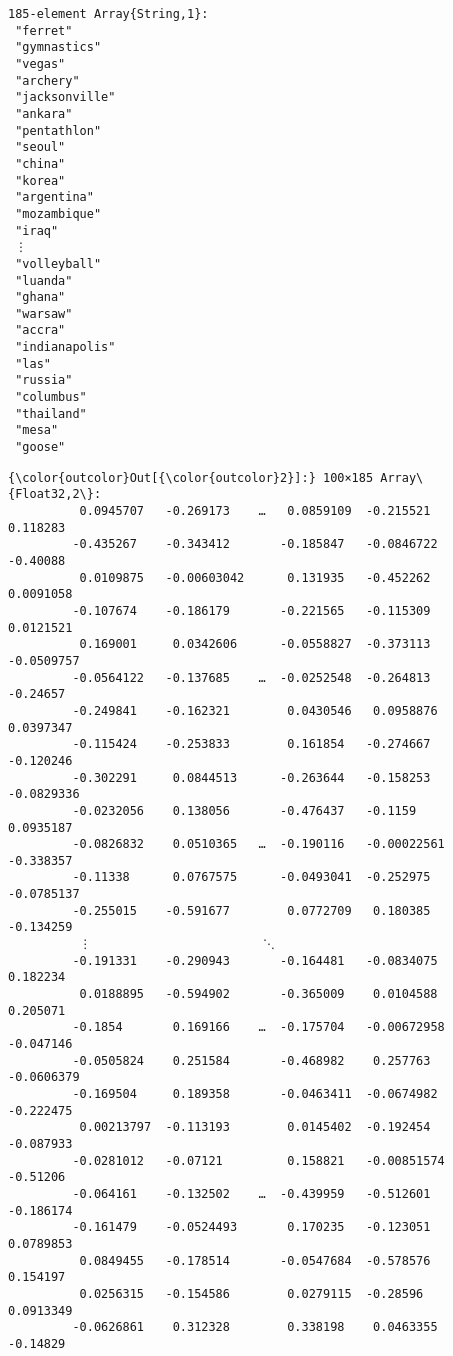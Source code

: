 \documentclass[11pt]{article}
\begin{document}
    
    \begin{verbatim}
185-element Array{String,1}:
 "ferret"      
 "gymnastics"  
 "vegas"       
 "archery"     
 "jacksonville"
 "ankara"      
 "pentathlon"  
 "seoul"       
 "china"       
 "korea"       
 "argentina"   
 "mozambique"  
 "iraq"        
 ⋮             
 "volleyball"  
 "luanda"      
 "ghana"       
 "warsaw"      
 "accra"       
 "indianapolis"
 "las"         
 "russia"      
 "columbus"    
 "thailand"    
 "mesa"        
 "goose"       
    \end{verbatim}

    
\begin{Verbatim}[commandchars=\\\{\}]
{\color{outcolor}Out[{\color{outcolor}2}]:} 100×185 Array\{Float32,2\}:
          0.0945707   -0.269173    …   0.0859109  -0.215521     0.118283 
         -0.435267    -0.343412       -0.185847   -0.0846722   -0.40088  
          0.0109875   -0.00603042      0.131935   -0.452262     0.0091058
         -0.107674    -0.186179       -0.221565   -0.115309     0.0121521
          0.169001     0.0342606      -0.0558827  -0.373113    -0.0509757
         -0.0564122   -0.137685    …  -0.0252548  -0.264813    -0.24657  
         -0.249841    -0.162321        0.0430546   0.0958876    0.0397347
         -0.115424    -0.253833        0.161854   -0.274667    -0.120246 
         -0.302291     0.0844513      -0.263644   -0.158253    -0.0829336
         -0.0232056    0.138056       -0.476437   -0.1159       0.0935187
         -0.0826832    0.0510365   …  -0.190116   -0.00022561  -0.338357 
         -0.11338      0.0767575      -0.0493041  -0.252975    -0.0785137
         -0.255015    -0.591677        0.0772709   0.180385    -0.134259 
          ⋮                        ⋱                                     
         -0.191331    -0.290943       -0.164481   -0.0834075    0.182234 
          0.0188895   -0.594902       -0.365009    0.0104588    0.205071 
         -0.1854       0.169166    …  -0.175704   -0.00672958  -0.047146 
         -0.0505824    0.251584       -0.468982    0.257763    -0.0606379
         -0.169504     0.189358       -0.0463411  -0.0674982   -0.222475 
          0.00213797  -0.113193        0.0145402  -0.192454    -0.087933 
         -0.0281012   -0.07121         0.158821   -0.00851574  -0.51206  
         -0.064161    -0.132502    …  -0.439959   -0.512601    -0.186174 
         -0.161479    -0.0524493       0.170235   -0.123051     0.0789853
          0.0849455   -0.178514       -0.0547684  -0.578576     0.154197 
          0.0256315   -0.154586        0.0279115  -0.28596      0.0913349
         -0.0626861    0.312328        0.338198    0.0463355   -0.14829  
\end{Verbatim}
            
\end{document}
